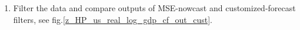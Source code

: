 \documentclass[a4paper]{book}
\begin{document}
\begin{enumerate}
\item Filter the data and compare outputs of MSE-nowcast and customized-forecast filters, see fig.\ref{z_HP_us_real_log_gdp_cf_out_cust}.

\end{enumerate}
\end{document}
